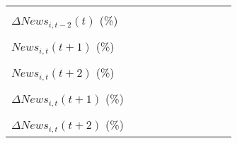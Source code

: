 {\begin{tabular}{l*{9}{c}}
                    &                     &                     &                     &                     &                     &                     &                     &                     &                     \\
\addlinespace
$ \Delta News_{i,t-2}(t)$ (\%)&                     &                     &                     &                     &                     &                     &                     &                     &                     \\
                    &                     &                     &                     &                     &                     &                     &                     &                     &                     \\
\addlinespace
$ News_{i,t}(t+1)$ (\%)&                     &                     &                     &                     &                     &                     &                     &                     &                     \\
                    &                     &                     &                     &                     &                     &                     &                     &                     &                     \\
\addlinespace
$ News_{i,t}(t+2)$ (\%)&                     &                     &                     &                     &                     &                     &                     &                     &                     \\
                    &                     &                     &                     &                     &                     &                     &                     &                     &                     \\
\addlinespace
$ \Delta News_{i,t}(t+1)$ (\%)&                     &                     &                     &                     &                     &                     &                     &                     &                     \\
                    &                     &                     &                     &                     &                     &                     &                     &                     &                     \\
\addlinespace
$ \Delta News_{i,t}(t+2)$ (\%)&                     &                     &                     &                     &                     &                     &                     &                     &                     \\

\end{tabular}}
